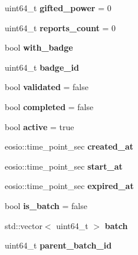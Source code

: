 \begin{DoxyCompactItemize}
uint64\+\_\+t {\bfseries gifted\+\_\+power} = 0
\item 
\mbox{\label{structtasks_a06754b6aa5c97e1be9fd2c4d6c87ec14}} 
uint64\+\_\+t {\bfseries reports\+\_\+count} = 0
\item 
\mbox{\label{structtasks_af9fad58b74a1abaf62159f207886d132}} 
bool {\bfseries with\+\_\+badge}
\item 
\mbox{\label{structtasks_a6f2215e4279786acdf18c2b55c5cd840}} 
uint64\+\_\+t {\bfseries badge\+\_\+id}
\item 
\mbox{\label{structtasks_afe5af40a582c8449c3077190c9cd0a78}} 
bool {\bfseries validated} = false
\item 
\mbox{\label{structtasks_a83e06aea80c059d8c7fac27ec33d65a7}} 
bool {\bfseries completed} = false
\item 
\mbox{\label{structtasks_a0fc8631b0327820af735ded60237a177}} 
bool {\bfseries active} = true
\item 
\mbox{\label{structtasks_ae74d43862baa65c4849a9508dca9fb7e}} 
eosio\+::time\+\_\+point\+\_\+sec {\bfseries created\+\_\+at}
\item 
\mbox{\label{structtasks_a5a306bc121712422d8daf5e9b6002e63}} 
eosio\+::time\+\_\+point\+\_\+sec {\bfseries start\+\_\+at}
\item 
\mbox{\label{structtasks_a3f18f667e301d7d22147dd837b8301ac}} 
eosio\+::time\+\_\+point\+\_\+sec {\bfseries expired\+\_\+at}
\item 
\mbox{\label{structtasks_a4b92b0e447cf09f59b21b1bf4e173a9f}} 
bool {\bfseries is\+\_\+batch} = false
\item 
\mbox{\label{structtasks_a20accf3519f1620e33def9da6d73ba74}} 
std\+::vector$<$ uint64\+\_\+t $>$ {\bfseries batch}
\item 
\mbox{\label{structtasks_a0414fbac42d48d631c985c51d203d8e3}} 
uint64\+\_\+t {\bfseries parent\+\_\+batch\+\_\+id}

\end{DoxyCompactItemize}
